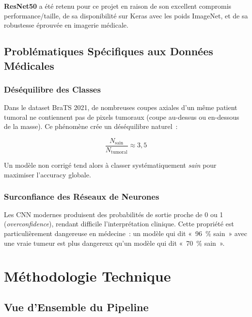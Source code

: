 \documentclass[12pt, a4paper]{report}
\begin{document}
\textbf{ResNet50} a été retenu pour ce projet en raison de son excellent
compromis performance/taille, de sa disponibilité sur Keras avec les
poids ImageNet, et de sa robustesse éprouvée en imagerie médicale.

\section{Problématiques Spécifiques aux Données Médicales}

\subsection{Déséquilibre des Classes}

Dans le dataset BraTS 2021, de nombreuses coupes axiales d'un même
patient tumoral ne contiennent pas de pixels tumoraux (coupe au-dessus
ou en-dessous de la masse). Ce phénomène crée un déséquilibre naturel~:

\begin{equation}
  \frac{N_{\text{sain}}}{N_{\text{tumoral}}} \approx 3{,}5
\end{equation}

Un modèle non corrigé tend alors à classer systématiquement
\textit{sain} pour maximiser l'accuracy globale.

\subsection{Surconfiance des Réseaux de Neurones}

Les CNN modernes produisent des probabilités de sortie proche de 0 ou 1
(\textit{overconfidence}), rendant difficile l'interprétation clinique.
Cette propriété est particulièrement dangereuse en médecine~: un modèle
qui dit «~96~\% sain~» avec une vraie tumeur est plus dangereux qu'un
modèle qui dit «~70~\% sain~».

\chapter{Méthodologie Technique}
\label{chap:methodo}

\section{Vue d'Ensemble du Pipeline}
\end{document}
